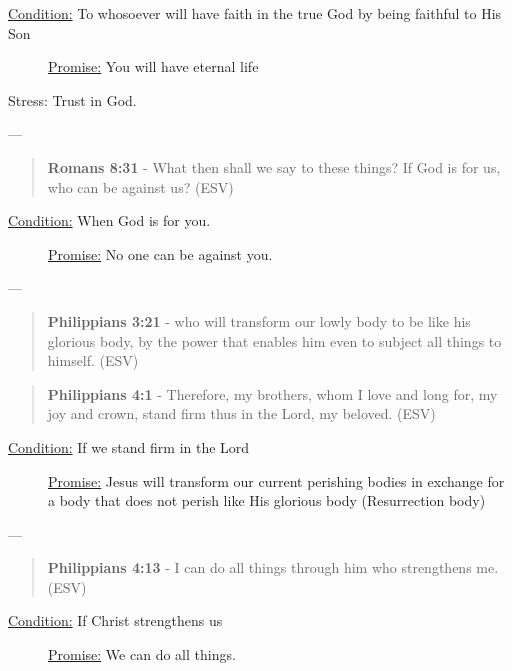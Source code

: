 \documentclass[11pt]{article}
\begin{document}
\begin{description}
\item[{\uline{Condition:} To whosoever will have faith in the true God by being faithful to His Son}] \uline{Promise:} You will have eternal life
\end{description}

Stress: Trust in God.

---

\begin{quote}
\textbf{Romans 8:31} - What then shall we say to these things? If God is for us, who can be against us? (ESV)
\end{quote}

\begin{description}
\item[{\uline{Condition:} When God is for you.}] \uline{Promise:} No one can be against you.
\end{description}

---

\begin{quote}
\textbf{Philippians 3:21} - who will transform our lowly body to be like his glorious body, by the power that enables him even to subject all things to himself. (ESV)
\end{quote}

\begin{quote}
\textbf{Philippians 4:1} - Therefore, my brothers, whom I love and long for, my joy and crown, stand firm thus in the Lord, my beloved. (ESV)
\end{quote}

\begin{description}
\item[{\uline{Condition:} If we stand firm in the Lord}] \uline{Promise:} Jesus will transform our current perishing bodies in exchange for a body that does not perish like His glorious body (Resurrection body)
\end{description}

---

\begin{quote}
\textbf{Philippians 4:13} - I can do all things through him who strengthens me. (ESV)
\end{quote}

\begin{description}
\item[{\uline{Condition:} If Christ strengthens us}] \uline{Promise:} We can do all things.
\end{description}
\end{document}
